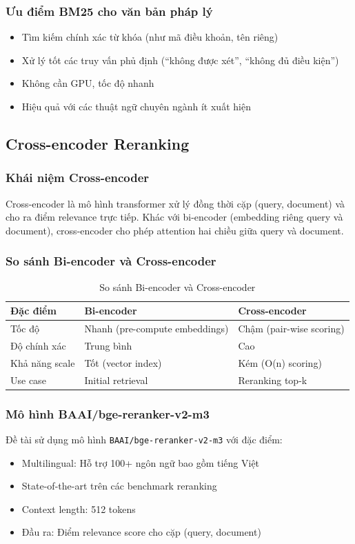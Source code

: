\documentclass[../DoAn.tex]{subfiles}
\begin{document}
\subsubsection{Ưu điểm BM25 cho văn bản pháp lý}
\begin{itemize}
    \item Tìm kiếm chính xác từ khóa (như mã điều khoản, tên riêng)
    \item Xử lý tốt các truy vấn phủ định (``không được xét'', ``không đủ điều kiện'')
    \item Không cần GPU, tốc độ nhanh
    \item Hiệu quả với các thuật ngữ chuyên ngành ít xuất hiện
\end{itemize}

\subsection{Cross-encoder Reranking}

\subsubsection{Khái niệm Cross-encoder}
Cross-encoder là mô hình transformer xử lý đồng thời cặp (query, document) và cho ra điểm relevance trực tiếp. Khác với bi-encoder (embedding riêng query và document), cross-encoder cho phép attention hai chiều giữa query và document.

\subsubsection{So sánh Bi-encoder và Cross-encoder}
\begin{table}[h]
\centering
\begin{tabular}{|l|l|l|}
\hline
\textbf{Đặc điểm} & \textbf{Bi-encoder} & \textbf{Cross-encoder} \\
\hline
Tốc độ & Nhanh (pre-compute embeddings) & Chậm (pair-wise scoring) \\
\hline
Độ chính xác & Trung bình & Cao \\
\hline
Khả năng scale & Tốt (vector index) & Kém (O(n) scoring) \\
\hline
Use case & Initial retrieval & Reranking top-k \\
\hline
\end{tabular}
\caption{So sánh Bi-encoder và Cross-encoder}
\end{table}

\subsubsection{Mô hình BAAI/bge-reranker-v2-m3}
Đề tài sử dụng mô hình \texttt{BAAI/bge-reranker-v2-m3} với đặc điểm:
\begin{itemize}
    \item Multilingual: Hỗ trợ 100+ ngôn ngữ bao gồm tiếng Việt
    \item State-of-the-art trên các benchmark reranking
    \item Context length: 512 tokens
    \item Đầu ra: Điểm relevance score cho cặp (query, document)
\end{itemize}
\end{document}
